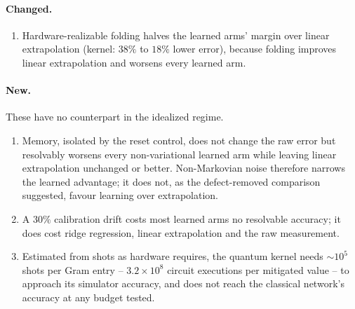\documentclass[Thesis.tex]{subfiles}
\begin{document}
\paragraph{Changed.}
\begin{enumerate}
    \item Hardware-realizable folding halves the learned arms' margin over linear
    extrapolation (kernel: $38\%$ to $18\%$ lower error), because folding improves
    linear extrapolation and worsens every learned arm.
\end{enumerate}

\paragraph{New.} These have no counterpart in the idealized regime.
\begin{enumerate}
    \item Memory, isolated by the reset control, does not change the raw error but
    resolvably worsens every non-variational learned arm while leaving linear
    extrapolation unchanged or better. Non-Markovian noise therefore narrows the
    learned advantage; it does not, as the defect-removed comparison suggested,
    favour learning over extrapolation.
    \item A $30\%$ calibration drift costs most learned arms no resolvable accuracy;
    it does cost ridge regression, linear extrapolation and the raw measurement.
    \item Estimated from shots as hardware requires, the quantum kernel needs
    $\sim 10^5$ shots per Gram entry -- $3.2 \times 10^8$ circuit executions per
    mitigated value -- to approach its simulator accuracy, and does not reach the
    classical network's accuracy at any budget tested.
\end{enumerate}
\end{document}
